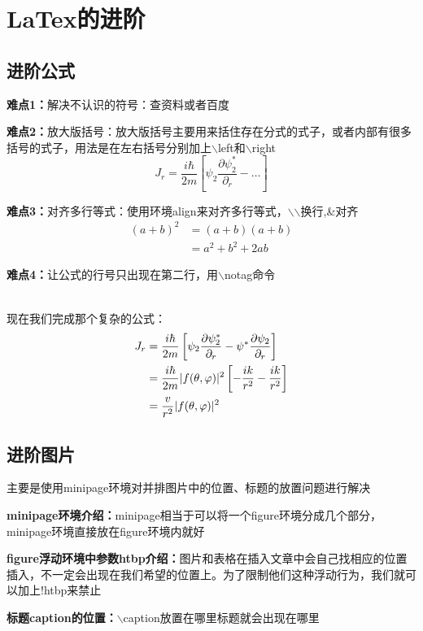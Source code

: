 \documentclass[UTF8]{ctexart}
\begin{document}
 	\section{LaTex的进阶}
 	\subsection{进阶公式}
 	\textbf{难点1：}解决不认识的符号：查资料或者百度
 	
 	\textbf{难点2：}放大版括号：放大版括号主要用来括住存在分式的式子，或者内部有很多括号的式子，用法是在左右括号分别加上$\backslash$left和$\backslash$right
 	\[
 		J_{r}=\dfrac{i\hbar}{2m}\left[\psi_{2}\dfrac{\partial\psi^*_2}{\partial_r}-\dots\right]
 	\]
 	
 	\textbf{难点3：}对齐多行等式：使用环境align来对齐多行等式，$\backslash$$\backslash$换行,\&对齐
 	\begin{align*}
 		(a+b)^{2}&=(a+b)(a+b) \\
 		         &=a^2+b^2+2ab
 	\end{align*}
 	
 	\textbf{难点4：}让公式的行号只出现在第二行，用$\backslash$notag命令
 	
 	~\\
 	现在我们完成那个复杂的公式：
 	\begin{align}
 		J_r&=\dfrac{i\hbar}{2m}\left[\psi_2\dfrac{\partial\psi^*_2}{\partial_r}-\psi^*\dfrac{\partial\psi_2}{\partial_r}\right] \notag \\
 		&=\dfrac{i\hbar}{2m}|f(\theta,\varphi)|^2\left[-\dfrac{ik}{r^2}-\dfrac{ik}{r^2}\right] \notag \\
 		&=\dfrac{v}{r^2}|f(\theta,\varphi)|^2
 	\end{align}
 	
    \subsection{进阶图片}
    主要是使用minipage环境对并排图片中的位置、标题的放置问题进行解决
    
    \textbf{minipage环境介绍：}minipage相当于可以将一个figure环境分成几个部分，minipage环境直接放在figure环境内就好
    
    \textbf{figure浮动环境中参数htbp介绍：}图片和表格在插入文章中会自己找相应的位置插入，不一定会出现在我们希望的位置上。为了限制他们这种浮动行为，我们就可以加上!htbp来禁止
    
    \textbf{标题caption的位置：}$\backslash$caption放置在哪里标题就会出现在哪里
    
\end{document}
